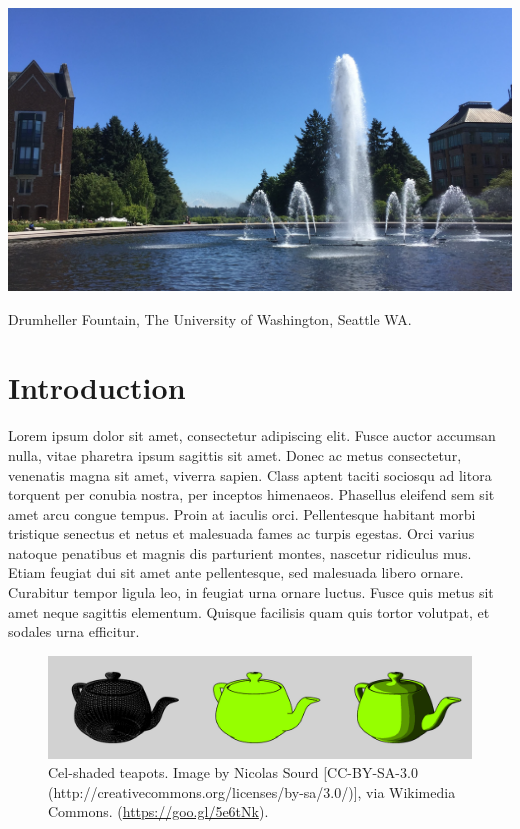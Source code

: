 \documentclass[acmtog]{acmart}
\begin{document}
\begin{teaserfigure}
  \centering
  \includegraphics[width=6.0in]{fountain}
  \caption{Drumheller Fountain, The University of Washington, Seattle WA.}
\end{teaserfigure}

\maketitle

\section{Introduction}

Lorem ipsum dolor sit amet, consectetur adipiscing elit. Fusce auctor accumsan nulla, vitae pharetra ipsum sagittis sit amet. \cite{Park:2006:DSI, notes2002} Donec ac metus consectetur, venenatis magna sit amet, viverra sapien. Class aptent taciti sociosqu ad litora torquent per conubia nostra, per inceptos himenaeos. Phasellus eleifend sem sit amet arcu congue tempus. Proin at iaculis orci. Pellentesque habitant morbi tristique senectus et netus et malesuada fames ac turpis egestas. Orci varius natoque penatibus et magnis dis parturient montes, nascetur ridiculus mus. \cite{Pellacini:2005:LAH} Etiam feugiat dui sit amet ante pellentesque, sed malesuada libero ornare. Curabitur tempor ligula leo, in feugiat urna ornare luctus. Fusce quis metus sit amet neque sagittis elementum. Quisque facilisis quam quis tortor volutpat, et sodales urna efficitur.

\begin{figure}[ht]
  \centering
  \includegraphics[width=\linewidth]{teapots}
  \caption{Cel-shaded teapots. Image by Nicolas Sourd [CC-BY-SA-3.0 (http://creativecommons.org/licenses/by-sa/3.0/)], via Wikimedia Commons. (\url{https://goo.gl/5e6tNk}).}
\end{figure}
\end{document}
